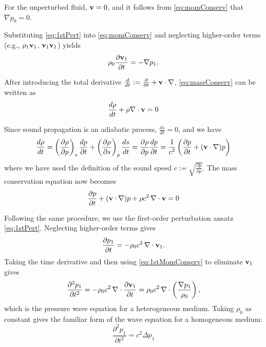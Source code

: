 \documentclass[final,num,12pt]{elsarticle}
\renewcommand{\v}{\TextOrMath{\textv}{\mathbf{v}}}
\begin{document}
For the unperturbed fluid, $\v=0$, and it follows from \cref{eq:momConserv} that $\nabla p_0=0$.
    
Substituting \cref{eq:1stPert} into \cref{eq:momConserv} and neglecting higher-order terms (e.g., $\rho_1\v_1$, $\v_1\v_1$) yields
        \begin{equation}
            \rho_0 \frac{\partial \v_1}{\partial t}=-\nabla p_1.
            \label{eq:1stMomConserv}            
        \end{equation}

After introducing the total derivative $\frac{d}{dt}:=\frac{\partial}{\partial t} + \v \cdot \nabla$, \cref{eq:massConserv} can be written as
\begin{equation}
    \frac{d \rho}{dt} + \rho \nabla\cdot\v =0 
\end{equation}

Since sound propagation is an adiabatic process, $\frac{d s}{d t}=0$, and we have
\begin{equation}
     \frac{d \rho}{dt} =\left( \frac{\partial \rho}{\partial p}\right)_s\frac{d p}{\partial t} + \left(\frac{\partial \rho}{\partial s}\right)_p\frac{d s}{d t} = \frac{\partial \rho}{\partial p}\frac{d p}{\partial t} = \frac{1}{c^2}\left(\frac{\partial p}{\partial t} + (\v\cdot\nabla)p\right)
\end{equation}
where we have used the definition of the sound speed $c:=\sqrt{\frac{\partial p}{\partial \rho}}$. The mass conservation equation now becomes
\begin{equation}
    \frac{\partial p}{\partial t} + (\v\cdot\nabla)p + \rho c^2 \, \nabla\cdot\v = 0
    \label{eq:pMassConti}
\end{equation}

Following the same procedure, we use the first-order perturbation ansatz \cref{eq:1stPert}. Neglecting higher-order terms gives
\begin{equation}
    \frac{\partial p_1}{\partial t} = -\rho_0 c^2\, \nabla \cdot \v_1.
    \label{eq:1stMassConserv}
\end{equation}
Taking the time derivative and then using \cref{eq:1stMomConserv} to eliminate $\v_1$ gives
\begin{equation}
    \frac{\partial^2 p_1}{\partial t^2}  = -\rho_0 c^2\, \nabla \cdot \frac{\partial \v_1}{ \partial t} =\rho_0 c^2\, \nabla \cdot\left(\frac{\nabla p_1}{\rho_0}\right),
    \label{eq:heteWaveP}
\end{equation}
which is the pressure wave equation for a heterogeneous medium. Taking $\rho_0$ as constant gives the familiar form of the wave equation for a homogeneous medium:
\begin{equation}
    \frac{\partial^2 p_1}{\partial t^2} = c^2 \Delta p_1
\end{equation}
\end{document}
